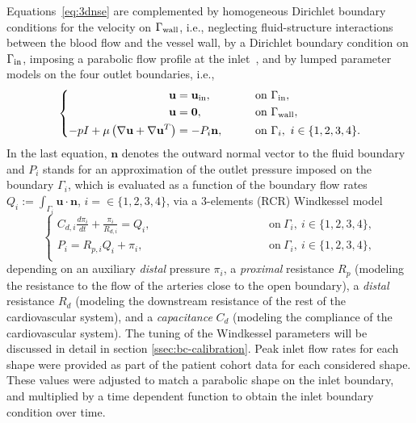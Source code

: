 Equations~\eqref{eq:3dnse} are complemented by homogeneous Dirichlet boundary conditions for the velocity on $\Gamma_{\rm \text{wall}}$, i.e., neglecting  fluid-structure interactions between the blood flow and the vessel wall, by a Dirichlet boundary condition on $\Gamma_{\rm in}$, imposing a parabolic flow profile at the inlet~\cite{katz2023impact}, and by lumped parameter models on the four outlet boundaries, i.e., 
\begin{equation}
  \label{eq:3dnse-bc}
\left\{
\begin{aligned}
\mathbf{u}&=\mathbf{u}_{\rm in},\qquad &&\text{on}\ \Gamma_{\rm in},\\
\mathbf{u}&=\mathbf{0},\qquad &&\text{on}\ \Gamma_{\text{wall}},\\
    -pI+\mu\left(\nabla\mathbf{u}+\nabla\mathbf{u}^T\right)&=-P_i\mathbf{n},\qquad &&\text{on}\ \Gamma_i,\ i\in\{1,2,3,4\}.
\end{aligned}
\right.
\end{equation}
In the last equation, $\mathbf{n}$ denotes the outward normal vector to the fluid boundary and $P_i$ stands for an approximation of the outlet pressure imposed on the boundary $\Gamma_i$, which is evaluated as a function of the boundary flow rates $Q_i:=\int_{\Gamma_i} \mathbf{u}\cdot\mathbf{n}$, $i=\in\{1,2,3,4\}$, 
via a 3-elements (RCR) Windkessel model~\cite{westerhof2009arterial}
\begin{equation}\label{eq:wk-rcr-i}
\left\{
\begin{aligned}
C_{d,i}\frac{d\pi_i}{dt}+\frac{\pi_i}{R_{d,i}}=Q_i,\qquad\qquad\qquad\qquad\ \;\,\quad&\text{on}\ \Gamma_i,\ i\in\{1,2,3,4\},\\
   P_i=R_{p,i}Q_i+\pi_i,\qquad\qquad\qquad\qquad\ \;\,\quad&\text{on}\ \Gamma_i,\ i\in\{1,2,3,4\},\\
\end{aligned}
\right.
\end{equation}
depending on an auxiliary \textit{distal} pressure $\pi_i$, a \textit{proximal} resistance $R_p$ (modeling the resistance to the flow of the arteries close to the open boundary), a \textit{distal} resistance $R_d$ (modeling the downstream resistance of the rest of the cardiovascular system), and a \textit{capacitance} $C_d$ (modeling the compliance of the cardiovascular system).
The tuning of the Windkessel parameters will be discussed in detail in section \ref{ssec:bc-calibration}.
%
Peak inlet flow rates for each shape were provided as part of the patient cohort data for each considered shape. These values  were adjusted to match a parabolic shape on the inlet boundary, and multiplied by a time dependent function to obtain the inlet boundary condition over time.

